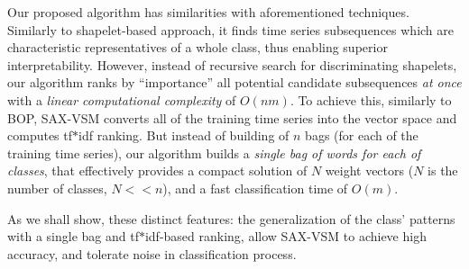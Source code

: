 \documentclass[conference]{IEEEtran}
\begin{document}
%

Our proposed algorithm has similarities with aforementioned techniques. 
Similarly to shapelet-based approach, it finds time series subsequences
which are characteristic representatives of a whole class, thus enabling
superior interpretability.
However, instead of recursive search for discriminating shapelets, 
our algorithm ranks by “importance” all potential candidate subsequences 
\textit{at once} with a \textit{linear computational complexity} of $O(nm)$.
To achieve this, similarly to BOP, \mbox{SAX-VSM} converts all of the 
training time series into the vector space and computes tf$\ast$idf ranking.
But instead of building of $n$ bags (for each of the training time series), 
our algorithm builds a \textit{single bag of words for each of classes}, 
that effectively provides a compact solution of $N$ weight vectors 
($N$ is the number of classes, $N<<n$), and a fast classification time of $O(m)$.

As we shall show, these distinct features: the generalization of the class' 
patterns with a single bag and tf$\ast$idf-based ranking, allow SAX-VSM 
to achieve high accuracy,  and tolerate noise in classification process.
\end{document}
